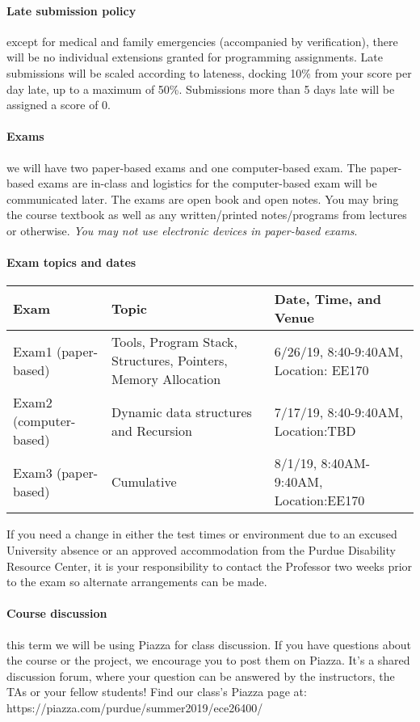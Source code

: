 \documentclass{article}
\begin{document}
\paragraph{Late submission policy} except for medical and family emergencies (accompanied by verification), there will be no individual extensions granted for programming assignments. Late submissions will be scaled according to lateness, docking 10\% from your score per day late, up to a maximum of 50\%. Submissions more than 5 days late will be assigned a score of 0.

\paragraph{Exams} we will have two paper-based exams and one computer-based exam. The paper-based exams are in-class and logistics for the computer-based exam will be communicated later.
The exams are open book and open notes. You may bring the course textbook as well as any written/printed notes/programs from lectures or otherwise. {\em You may not use electronic devices in paper-based exams}.

\paragraph{Exam topics and dates}
\begin{table}[H]
\centering
\begin{tabulary}{\linewidth}{|l|p{70mm}|p{40mm}|}\hline
Exam & Topic & Date, Time, and Venue \\ \hline
Exam1 (paper-based) & Tools, Program Stack, Structures, Pointers, Memory Allocation &  6/26/19, 8:40-9:40AM, Location: EE170 \\ \hline
Exam2 (computer-based) & Dynamic data structures and Recursion & 7/17/19, 8:40-9:40AM, Location:TBD \\ \hline
Exam3 (paper-based) & Cumulative & 8/1/19, 8:40AM-9:40AM, Location:EE170 \\
\hline
\end{tabulary}
\end{table}

If you need a change in either the test times or environment due to an excused University absence or an approved accommodation from the Purdue Disability Resource Center, it is your responsibility to contact the Professor two weeks prior to the exam so alternate arrangements can be made. 

\paragraph{Course discussion} this term we will be using Piazza for class discussion. If you have questions about the course or the project, we encourage you to post them on Piazza. It's a shared discussion forum, where your question can be answered by the instructors, the TAs or your fellow students! Find our class's Piazza page at: https://piazza.com/purdue/summer2019/ece26400/
\end{document}
